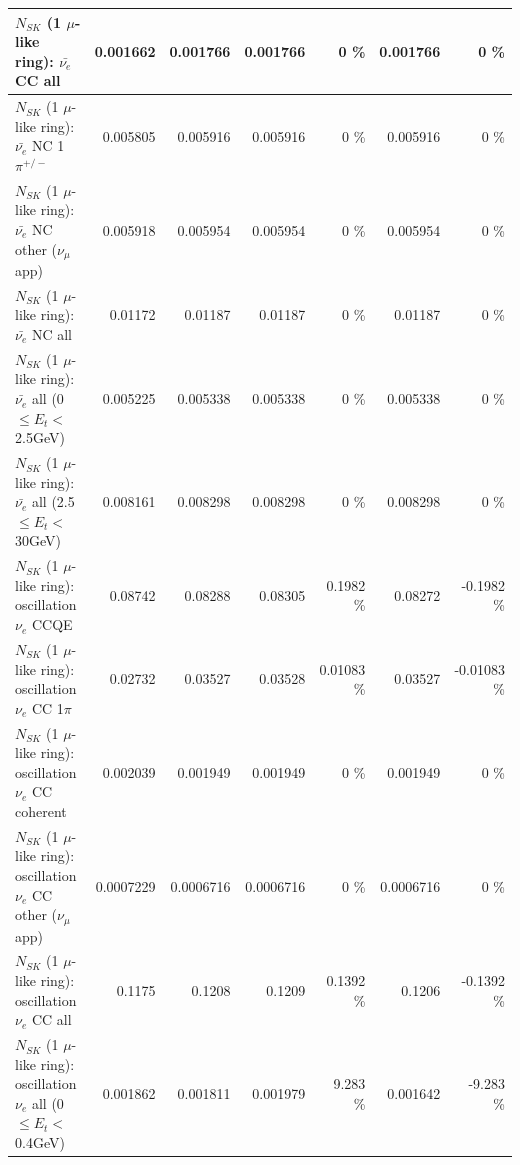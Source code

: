 \begin{table}
\begin{tabular}{| l | r | r | r  r | r  r |}
                            $N_{SK}$ (1 $\mu$-like ring): $\bar{\nu_{e}}$ CC all &        0.001662 &        0.001766 &        0.001766 &        0 \%  &        0.001766 &        0 \%  \\ 
\hline
                     $N_{SK}$ (1 $\mu$-like ring): $\bar{\nu_e}$ NC 1$\pi^{+/-}$ &        0.005805 &        0.005916 &        0.005916 &        0 \%  &        0.005916 &        0 \%  \\ 
            $N_{SK}$ (1 $\mu$-like ring): $\bar{\nu_e}$ NC other ($\nu_\mu$ app) &        0.005918 &        0.005954 &        0.005954 &        0 \%  &        0.005954 &        0 \%  \\ 
                            $N_{SK}$ (1 $\mu$-like ring): $\bar{\nu_{e}}$ NC all &         0.01172 &         0.01187 &         0.01187 &        0 \%  &         0.01187 &        0 \%  \\ 
\hline
     $N_{SK}$ (1 $\mu$-like ring): $\bar{\nu_{e}}$ all (0 $\leq E_{t} <$ 2.5GeV) &        0.005225 &        0.005338 &        0.005338 &        0 \%  &        0.005338 &        0 \%  \\ 
    $N_{SK}$ (1 $\mu$-like ring): $\bar{\nu_{e}}$ all (2.5 $\leq E_{t} <$ 30GeV) &        0.008161 &        0.008298 &        0.008298 &        0 \%  &        0.008298 &        0 \%  \\ 
\hline
\hline
\hline
                          $N_{SK}$ (1 $\mu$-like ring): oscillation $\nu_e$ CCQE &         0.08742 &         0.08288 &         0.08305 &   0.1982 \%  &         0.08272 &  -0.1982 \%  \\ 
                     $N_{SK}$ (1 $\mu$-like ring): oscillation $\nu_e$ CC 1$\pi$ &         0.02732 &         0.03527 &         0.03528 &  0.01083 \%  &         0.03527 & -0.01083 \%  \\ 
                   $N_{SK}$ (1 $\mu$-like ring): oscillation $\nu_e$ CC coherent &        0.002039 &        0.001949 &        0.001949 &        0 \%  &        0.001949 &        0 \%  \\ 
      $N_{SK}$ (1 $\mu$-like ring): oscillation $\nu_e$ CC other ($\nu_\mu$ app) &       0.0007229 &       0.0006716 &       0.0006716 &        0 \%  &       0.0006716 &        0 \%  \\ 
                       $N_{SK}$ (1 $\mu$-like ring): oscillation $\nu_e$  CC all &          0.1175 &          0.1208 &          0.1209 &   0.1392 \%  &          0.1206 &  -0.1392 \%  \\ 
\hline
$N_{SK}$ (1 $\mu$-like ring): oscillation $\nu_{e}$ all (0 $\leq E_{t} <$ 0.4GeV) &        0.001862 &        0.001811 &        0.001979 &    9.283 \%  &        0.001642 &   -9.283 \%  \\ 

\end{tabular}
\end{table}
